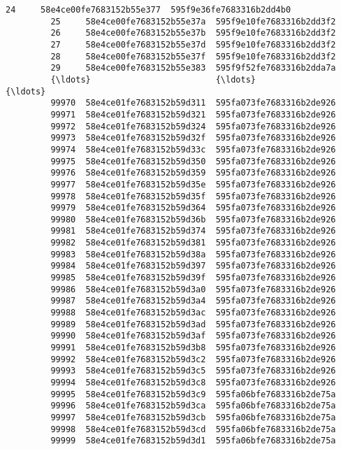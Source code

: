 \documentclass[11pt]{article}
\begin{document}
\begin{Verbatim}[commandchars=\\\{\}]
         24     58e4ce00fe7683152b55e377  595f9e36fe7683316b2dd4b0   
         25     58e4ce00fe7683152b55e37a  595f9e10fe7683316b2dd3f2   
         26     58e4ce00fe7683152b55e37b  595f9e10fe7683316b2dd3f2   
         27     58e4ce00fe7683152b55e37d  595f9e10fe7683316b2dd3f2   
         28     58e4ce00fe7683152b55e37f  595f9e10fe7683316b2dd3f2   
         29     58e4ce00fe7683152b55e383  595f9f52fe7683316b2dda7a   
         {\ldots}                         {\ldots}                       {\ldots}   
         99970  58e4ce01fe7683152b59d311  595fa073fe7683316b2de926   
         99971  58e4ce01fe7683152b59d321  595fa073fe7683316b2de926   
         99972  58e4ce01fe7683152b59d324  595fa073fe7683316b2de926   
         99973  58e4ce01fe7683152b59d32f  595fa073fe7683316b2de926   
         99974  58e4ce01fe7683152b59d33c  595fa073fe7683316b2de926   
         99975  58e4ce01fe7683152b59d350  595fa073fe7683316b2de926   
         99976  58e4ce01fe7683152b59d359  595fa073fe7683316b2de926   
         99977  58e4ce01fe7683152b59d35e  595fa073fe7683316b2de926   
         99978  58e4ce01fe7683152b59d35f  595fa073fe7683316b2de926   
         99979  58e4ce01fe7683152b59d364  595fa073fe7683316b2de926   
         99980  58e4ce01fe7683152b59d36b  595fa073fe7683316b2de926   
         99981  58e4ce01fe7683152b59d374  595fa073fe7683316b2de926   
         99982  58e4ce01fe7683152b59d381  595fa073fe7683316b2de926   
         99983  58e4ce01fe7683152b59d38a  595fa073fe7683316b2de926   
         99984  58e4ce01fe7683152b59d397  595fa073fe7683316b2de926   
         99985  58e4ce01fe7683152b59d39f  595fa073fe7683316b2de926   
         99986  58e4ce01fe7683152b59d3a0  595fa073fe7683316b2de926   
         99987  58e4ce01fe7683152b59d3a4  595fa073fe7683316b2de926   
         99988  58e4ce01fe7683152b59d3ac  595fa073fe7683316b2de926   
         99989  58e4ce01fe7683152b59d3ad  595fa073fe7683316b2de926   
         99990  58e4ce01fe7683152b59d3af  595fa073fe7683316b2de926   
         99991  58e4ce01fe7683152b59d3b8  595fa073fe7683316b2de926   
         99992  58e4ce01fe7683152b59d3c2  595fa073fe7683316b2de926   
         99993  58e4ce01fe7683152b59d3c5  595fa073fe7683316b2de926   
         99994  58e4ce01fe7683152b59d3c8  595fa073fe7683316b2de926   
         99995  58e4ce01fe7683152b59d3c9  595fa06bfe7683316b2de75a   
         99996  58e4ce01fe7683152b59d3ca  595fa06bfe7683316b2de75a   
         99997  58e4ce01fe7683152b59d3cb  595fa06bfe7683316b2de75a   
         99998  58e4ce01fe7683152b59d3cd  595fa06bfe7683316b2de75a   
         99999  58e4ce01fe7683152b59d3d1  595fa06bfe7683316b2de75a   
         

\end{Verbatim}
\end{document}
